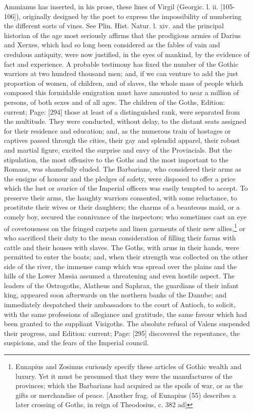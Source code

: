 {Ammianus has inserted, in his prose, these lines of Virgil (Georgic. l. ii. [105-106]), originally designed by the poet to express the impossibility of numbering the different sorts of vines. See Plin. Hist. Natur. l. xiv.} and the principal historian of the age most seriously affirms that the prodigious armies of Darius and Xerxes, which had so long been considered as the fables of vain and credulous antiquity, were now justified, in the eyes of mankind, by the evidence of fact and experience. A probable testimony has fixed the number of the Gothic warriors at two hundred thousand men; and, if we can venture to add the just proportion of women, of children, and of slaves, the whole mass of people which composed this formidable emigration must have amounted to near a million of persons, of both sexes and of all ages. The children of the Goths, Edition: current; Page: [294] those at least of a distinguished rank, were separated from the multitude. They were conducted, without delay, to the distant seats assigned for their residence and education; and, as the numerous train of hostages or captives passed through the cities, their gay and splendid apparel, their robust and martial figure, excited the surprise and envy of the Provincials. But the stipulation, the most offensive to the Goths and the most important to the Romans, was shamefully eluded. The Barbarians, who considered their arms as the ensigns of honour and the pledges of safety, were disposed to offer a price which the lust or avarice of the Imperial officers was easily tempted to accept. To preserve their arms, the haughty warriors consented, with some reluctance, to prostitute their wives or their daughters; the charms of a beauteous maid, or a comely boy, secured the connivance of the inspectors; who sometimes cast an eye of covetousness on the fringed carpets and linen garments of their new allies,\footnote{Eunapius and Zosimus curiously specify these articles of Gothic wealth and luxury. Yet it must be presumed that they were the manufactures of the provinces; which the Barbarians had acquired as the spoils of war, or as the gifts or merchandise of peace. [Another frag. of Eunapius (55) describes a later crossing of Goths, in reign of Theodosius, c. 382 ad]} or who sacrificed their duty to the mean consideration of filling their farms with cattle and their houses with slaves. The Goths, with arms in their hands, were permitted to enter the boats; and, when their strength was collected on the other side of the river, the immense camp which was spread over the plains and the hills of the Lower Mæsia assumed a threatening and even hostile aspect. The leaders of the Ostrogoths, Alatheus and Saphrax, the guardians of their infant king, appeared soon afterwards on the northern banks of the Danube; and immediately despatched their ambassadors to the court of Antioch, to solicit, with the same professions of allegiance and gratitude, the same favour which had been granted to the suppliant Visigoths. The absolute refusal of Valens suspended their progress, and Edition: current; Page: [295] discovered the repentance, the suspicions, and the fears of the Imperial council.

